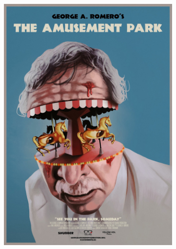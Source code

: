 \documentclass{article}
\begin{document}
\begin{figure}[H]
    \centering
    \begin{subfigure}{.3\textwidth}
        \centering
        \includegraphics[scale=0.1]{q2/amuse.jpg}
    \end{subfigure}
    \begin{subfigure}{.3\textwidth}
        \centering

\end{subfigure}
\end{figure}
\end{document}
